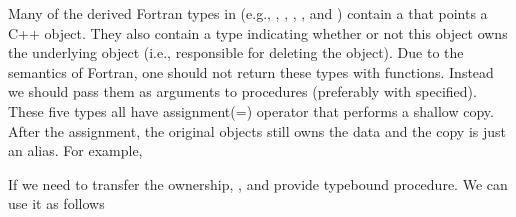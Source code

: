 \documentclass[letterpaper,10pt,english]{sphinxmanual}
\begin{document}
\sphinxAtStartPar
Many of the derived Fortran types in (e.g., ,
, , ,
and ) contain a  that points a
C++ object. They also contain a  type indicating whether or
not this object owns the underlying object (i.e., responsible for deleting the
object). Due to the semantics of Fortran, one should not return these types
with functions. Instead we should pass them as arguments to procedures
(preferably with  specified). These five types all have
assignment(=) operator that performs a shallow copy. After the assignment, the
original objects still owns the data and the copy is just an alias. For
example,

\begin{sphinxVerbatim}[commandchars=\\\{\}]
   
 
 
     
  
\end{sphinxVerbatim}

\sphinxAtStartPar
If we need to transfer the ownership, ,
 and  provide type\sphinxhyphen{}bound
 procedure. We can use it as follows
\end{document}
